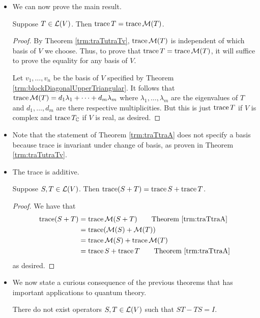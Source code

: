 \documentclass[../main.tex]{subfiles}
\begin{document}
\begin{itemize}
\begin{theorem}
\begin{proof}
            as desired.
        \end{proof}
    \end{theorem}
    \item We can now prove the main result.
    \begin{theorem}\label{trm:traTtraA}
        Suppose $T\in\mathcal{L}(V)$. Then $\operatorname{trace} T=\operatorname{trace}\mathcal{M}(T)$.
        \begin{proof}
            By Theorem \ref{trm:traTutraTv}, $\operatorname{trace}\mathcal{M}(T)$ is independent of which basis of $V$ we choose. Thus, to prove that $\operatorname{trace} T=\operatorname{trace}\mathcal{M}(T)$, it will suffice to prove the equality for any basis of $V$.\par
            Let $v_1,\dots,v_n$ be the basis of $V$ specified by Theorem \ref{trm:blockDiagonalUpperTriangular}. It follows that $\operatorname{trace}\mathcal{M}(T)=d_1\lambda_1+\cdots+d_m\lambda_m$ where $\lambda_1,\dots,\lambda_m$ are the eigenvalues of $T$ and $d_1,\dots,d_m$ are there respective multiplicities. But this is just $\operatorname{trace} T$ if $V$ is complex and $\operatorname{trace} T_{\mathbb{C}}$ if $V$ is real, as desired.
        \end{proof}
    \end{theorem}
    \item Note that the statement of Theorem \ref{trm:traTtraA} does not specify a basis because trace is invariant under change of basis, as proven in Theorem \ref{trm:traTutraTv}.
    \item The trace is additive.
    \begin{theorem}\label{trm:traAdditive}
        Suppose $S,T\in\mathcal{L}(V)$. Then $\operatorname{trace}(S+T)=\operatorname{trace} S+\operatorname{trace} T$.
        \begin{proof}
            We have that
            \begin{align*}
                \tra(S+T) &= \tra\mat{S+T}\tag*{Theorem \ref{trm:traTtraA}}\\
                &= \tra(\mat{S}+\mat{T})\\
                &= \tra\mat{S}+\tra\mat{T}\\
                &= \tra S+\tra T\tag*{Theorem \ref{trm:traTtraA}}
            \end{align*}
            as desired.
        \end{proof}
    \end{theorem}
    \item We now state a curious consequence of the previous theorems that has important applications to quantum theory.
    \begin{theorem}
        There do not exist operators $S,T\in\mathcal{L}(V)$ such that $ST-TS=I$.

\end{theorem}
\end{itemize}
\end{document}
